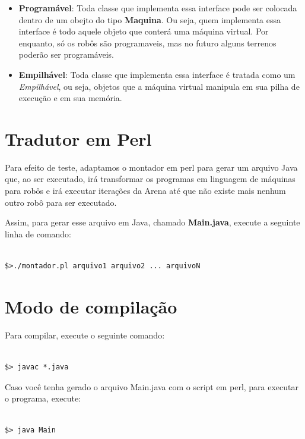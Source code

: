 \documentclass[11pt]{article}
\begin{document}
\begin{itemize}

	\item \textbf{Programável}: Toda classe que implementa essa interface pode ser colocada dentro
	de um obejto do tipo \textbf{\color{red}Maquina}. Ou seja, quem implementa essa interface é
	todo aquele objeto que conterá uma máquina virtual. Por enquanto, só os robôs são programaveis,
	mas no futuro alguns terrenos poderão ser programáveis.

	\item \textbf{Empilhável}: Toda classe que implementa essa interface é tratada como um \emph{Empilhável},
	ou seja, objetos que a máquina virtual manipula em sua pilha de execução e em sua memória.

\end{itemize}


\section{Tradutor em Perl}

Para efeito de teste, adaptamos o montador em perl para gerar um arquivo Java que, ao ser executado, irá transformar os programas em linguagem de máquinas para robôs e irá executar iterações da Arena até que não existe mais nenhum outro robô para ser executado.

Assim, para gerar esse arquivo em Java, chamado \textbf{\color{red}Main.java}, execute a seguinte linha de comando:
\begin{verbatim}

$>./montador.pl arquivo1 arquivo2 ... arquivoN

\end{verbatim}

\section{Modo de compilação}

Para compilar, execute o seguinte comando:

\begin{verbatim}

$> javac *.java

\end{verbatim}

Caso você tenha gerado o arquivo Main.java com o script em perl, para executar o programa, execute:

\begin{verbatim}

$> java Main

\end{verbatim}
\end{document}
